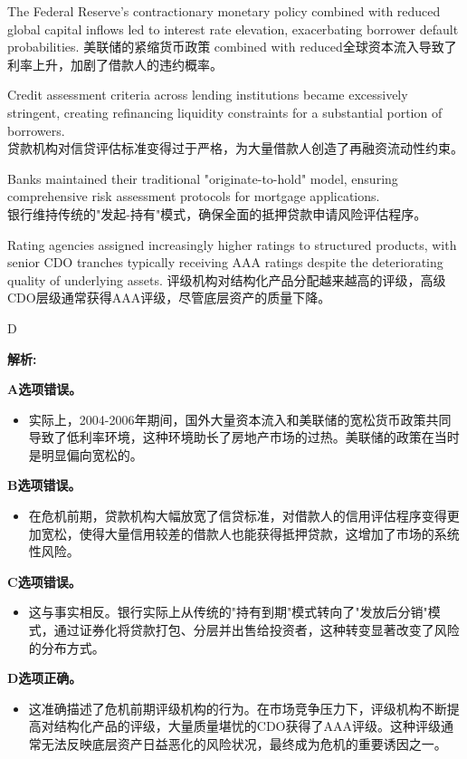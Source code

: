 \documentclass{article}
\newenvironment{explanation}
{\textbf{解析:}\par}
{\par}
\begin{document}
\begin{choices}
     \item The Federal Reserve's contractionary monetary policy combined with reduced global capital inflows led to interest rate elevation, exacerbating borrower default probabilities.
    美联储的紧缩货币政策 combined with reduced全球资本流入导致了利率上升，加剧了借款人的违约概率。
    \item Credit assessment criteria across lending institutions became excessively stringent, creating refinancing liquidity constraints for a substantial portion of borrowers. \\
    贷款机构对信贷评估标准变得过于严格，为大量借款人创造了再融资流动性约束。
    \item Banks maintained their traditional "originate-to-hold" model, ensuring comprehensive risk assessment protocols for mortgage applications. \\
    银行维持传统的"发起-持有"模式，确保全面的抵押贷款申请风险评估程序。
    \item Rating agencies assigned increasingly higher ratings to structured products, with senior CDO tranches typically receiving AAA ratings despite the deteriorating quality of underlying assets.
    评级机构对结构化产品分配越来越高的评级，高级CDO层级通常获得AAA评级，尽管底层资产的质量下降。
\end{choices}

\begin{correctanswer}
    D
\end{correctanswer}

\begin{explanation}
    \textbf{A选项错误。}
    \begin{itemize}
        \item 实际上，2004-2006年期间，国外大量资本流入和美联储的宽松货币政策共同导致了低利率环境，这种环境助长了房地产市场的过热。美联储的政策在当时是明显偏向宽松的。
    \end{itemize}

    \textbf{B选项错误。}
    \begin{itemize}
        \item 在危机前期，贷款机构大幅放宽了信贷标准，对借款人的信用评估程序变得更加宽松，使得大量信用较差的借款人也能获得抵押贷款，这增加了市场的系统性风险。
    \end{itemize}

    \textbf{C选项错误。}
    \begin{itemize}
        \item 这与事实相反。银行实际上从传统的"持有到期"模式转向了"发放后分销"模式，通过证券化将贷款打包、分层并出售给投资者，这种转变显著改变了风险的分布方式。
    \end{itemize}

    \textbf{D选项正确。}
    \begin{itemize}
        \item 这准确描述了危机前期评级机构的行为。在市场竞争压力下，评级机构不断提高对结构化产品的评级，大量质量堪忧的CDO获得了AAA评级。这种评级通常无法反映底层资产日益恶化的风险状况，最终成为危机的重要诱因之一。
    \end{itemize}
\end{explanation}
\end{document}
